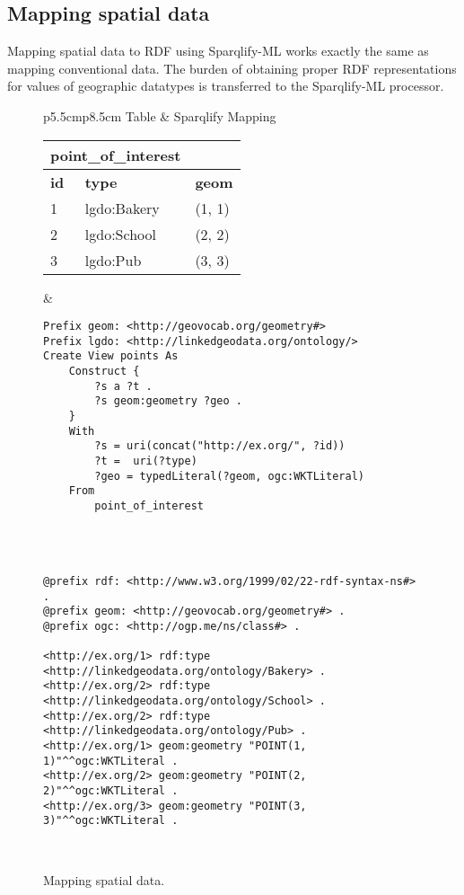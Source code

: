 \documentclass[a4paper,twoside,bibtotoc,abstracton,12pt,BCOR=15mm]{scrreprt}
\begin{document}
\newpage
\subsection{Mapping spatial data}
Mapping spatial data to RDF using Sparqlify-ML works exactly the same as mapping conventional data.
The burden of obtaining proper RDF representations for values of geographic datatypes is transferred to the Sparqlify-ML processor.

\begin{figure}[!h]
\centering
\begin{tabular}{p{5.5cm}p{8.5cm}}
\toprule
Table & Sparqlify Mapping \\ 
\midrule

\begin{tabular}{|l|l|l|} \cline{1-2}
\multicolumn{2}{|c|}{point\_of\_interest} \\ \hline
\textbf{id} & \textbf{type} & \textbf{geom} \\ \hline
1 & lgdo:Bakery & (1, 1) \\ \hline
2 & lgdo:School & (2, 2) \\ \hline
3 & lgdo:Pub    & (3, 3) \\ \hline
\end{tabular}

&

\begin{minipage}{8.5cm}
\begin{scriptsize}
\begin{verbatim}
Prefix geom: <http://geovocab.org/geometry#>
Prefix lgdo: <http://linkedgeodata.org/ontology/>
Create View points As
    Construct {
        ?s a ?t .
        ?s geom:geometry ?geo .
    }
    With
        ?s = uri(concat("http://ex.org/", ?id))
        ?t =  uri(?type)
        ?geo = typedLiteral(?geom, ogc:WKTLiteral)
    From
        point_of_interest
\end{verbatim}
\end{scriptsize}
\end{minipage}

\\

 \\ \midrule
\begin{minipage}{\textwidth}
\begin{lstlisting}
@prefix rdf: <http://www.w3.org/1999/02/22-rdf-syntax-ns#> .
@prefix geom: <http://geovocab.org/geometry#> .
@prefix ogc: <http://ogp.me/ns/class#> .

<http://ex.org/1> rdf:type <http://linkedgeodata.org/ontology/Bakery> .
<http://ex.org/2> rdf:type <http://linkedgeodata.org/ontology/School> .
<http://ex.org/2> rdf:type <http://linkedgeodata.org/ontology/Pub> .
<http://ex.org/1> geom:geometry "POINT(1, 1)"^^ogc:WKTLiteral .
<http://ex.org/2> geom:geometry "POINT(2, 2)"^^ogc:WKTLiteral .
<http://ex.org/3> geom:geometry "POINT(3, 3)"^^ogc:WKTLiteral .
\end{lstlisting}
\end{minipage}
\\
\bottomrule
\end{tabular}
\caption{Mapping spatial data.}
\label{fig:ex:mapping:spatial-data}
\end{figure}
\end{document}
